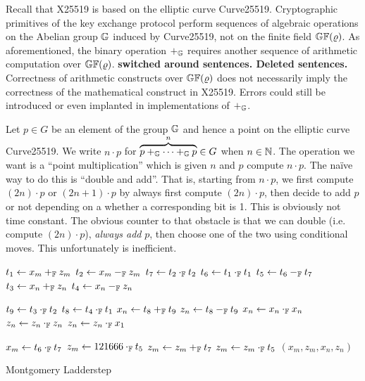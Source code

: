 

Recall that X25519 is based on the elliptic curve Curve25519.
Cryptographic primitives of the key exchange protocol perform
sequences of algebraic operations on the Abelian group $\mathbb{G}$ induced
by Curve25519, not on the finite field $\mathbb{GF}(\varrho)$. As
aforementioned, the binary operation $+_{\mathbb{G}}$ requires another
sequence of arithmetic computation over $\mathbb{GF}(\varrho)$.
\textbf{switched around sentences.  Deleted sentences.}
Correctness of arithmetic constructs over $\mathbb{GF}(\varrho)$ does not
necessarily imply the correctness of the mathematical construct in
X25519. Errors could still be introduced or even implanted in
implementations of $+_{\mathbb{G}}$.

Let $p \in G$ be an element of the group $\mathbb{G}$ and hence a point on
the elliptic curve Curve25519. We write $n \cdot p$ for
$\overbrace{p +_{\mathbb{G}} \cdots +_{\mathbb{G}} p}^n \in G$ when $n \in \mathbb{N}$.
The operation we want is a ``point multiplication'' which is given $n$
and $p$ compute $n \cdot p$.  The na\"ive way to do this is ``double
and add''.  That is, starting from $n \cdot p$, we first compute
$(2n) \cdot p$ or $(2n+1) \cdot p$ by always first compute
$(2n) \cdot p$, then decide to add $p$ or not depending on a whether a
corresponding bit is 1.  This is obviously not time constant.  The
obvious counter to that obstacle is that we can double (i.e. compute
$(2n)\cdot p$), \emph{always add} $p$, then choose one of the two using
conditional moves.  This unfortunately is inefficient.

\begin{algorithm}[h]
\label{evaluation:ladder-step:montgomery}
\begin{algorithmic}[1]
\begin{multicols}{3}
\State $t_1 \leftarrow x_m +_{\mathbb{F}} z_m$
\State $t_2 \leftarrow x_m -_{\mathbb{F}} z_m$
\State $t_7 \leftarrow t_2 \cdot_{\mathbb{F}} t_2$
\State $t_6 \leftarrow t_1 \cdot_{\mathbb{F}} t_1$
\State $t_5 \leftarrow t_6 -_{\mathbb{F}} t_7$
\State $t_3 \leftarrow x_n +_{\mathbb{F}} z_n$
\State $t_4 \leftarrow x_n -_{\mathbb{F}} z_n$\rule{0ex}{0ex}
\State $t_9 \leftarrow t_3 \cdot_{\mathbb{F}} t_2$
\State $t_8 \leftarrow t_4 \cdot_{\mathbb{F}} t_1$
\State $x_n \leftarrow t_8 +_{\mathbb{F}} t_9$
\State $z_n \leftarrow t_8 -_{\mathbb{F}} t_9$
\State $x_n \leftarrow x_{n} \cdot_{\mathbb{F}} x_{n}$
\State $z_n \leftarrow z_{n} \cdot_{\mathbb{F}} z_{n}$
\State $z_n \leftarrow z_{n} \cdot_{\mathbb{F}} x_1$\rule{0ex}{0ex} 
\State $x_m \leftarrow t_6 \cdot_{\mathbb{F}} t_7$
\State $z_m \leftarrow 121666 \cdot_{\mathbb{F}} t_5$
\State $z_m \leftarrow z_m +_{\mathbb{F}} t_7$
\State $z_m \leftarrow z_m \cdot_{\mathbb{F}} t_5$
\State \Return $(x_m, z_m, x_n, z_n)$
\EndFunction
\end{multicols}
\end{algorithmic}
\caption{Montgomery Ladderstep}
\end{algorithm}


